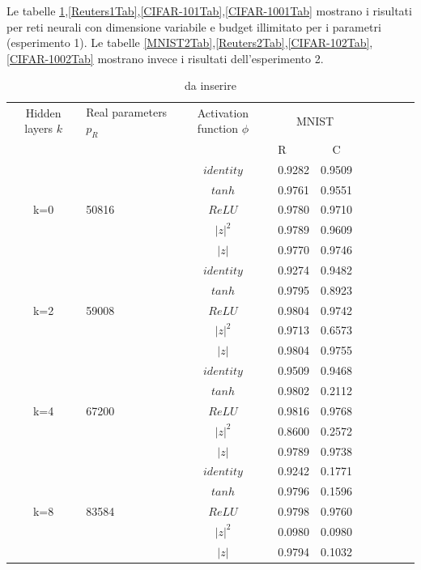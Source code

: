 \documentclass[a4paper,10pt]{article}
\begin{document}
 Le tabelle \ref{MNIST1Tab},\ref{Reuters1Tab},\ref{CIFAR-101Tab},\ref{CIFAR-1001Tab} mostrano i risultati per reti neurali con dimensione variabile e budget illimitato per i parametri (esperimento 1). Le tabelle \ref{MNIST2Tab},\ref{Reuters2Tab},\ref{CIFAR-102Tab},\ref{CIFAR-1002Tab} mostrano invece i risultati dell'esperimento 2.
 
 \begin{table}
  \centering
  \begin{tabular}{cp{} cp{}   cp{} cp{} cp{}}
   \cline{1-5}
   Hidden layers $k$ & Real parameters $p_R$ & Activation function $\phi$ & \multicolumn{2}{c}{MNIST}\\
   \cline{4-5}
   & & & R & C \\
   \cline{1-5}
   & & $identity$ & 0.9282 & 0.9509 \\
   \cline{3-5}
   & & $tanh$ & 0.9761 & 0.9551 \\
   \cline{3-5}
   k=0 & 50816 & $ReLU$ & 0.9780 & 0.9710 \\
   \cline{3-5}
   & & $|z|^2$ & 0.9789 & 0.9609 \\
   \cline{3-5}
   & & $|z|$ & 0.9770 & 0.9746 \\
   \cline{1-5}
  
   & & $identity$ & 0.9274 & 0.9482 \\
   \cline{3-5}
   & & $tanh$ & 0.9795 & 0.8923 \\
   \cline{3-5}
   k=2 & 59008 & $ReLU$ & 0.9804 & 0.9742 \\
   \cline{3-5}
   & & $|z|^2$ & 0.9713 & 0.6573 \\
   \cline{3-5}
   & & $|z|$ & 0.9804 & 0.9755 \\
   \cline{1-5}
  
   & & $identity$ & 0.9509 & 0.9468 \\
   \cline{3-5}
   & & $tanh$ & 0.9802 & 0.2112 \\
   \cline{3-5}
   k=4 & 67200 & $ReLU$ & 0.9816 & 0.9768 \\
   \cline{3-5}
   & & $|z|^2$ & 0.8600 & 0.2572 \\
   \cline{3-5}
   & & $|z|$ & 0.9789 & 0.9738 \\
   \cline{1-5}
   
   & & $identity$ & 0.9242 & 0.1771 \\
   \cline{3-5}
   & & $tanh$ & 0.9796 & 0.1596 \\
   \cline{3-5}
   k=8 & 83584 & $ReLU$ & 0.9798 & 0.9760 \\
   \cline{3-5}
   & & $|z|^2$ & 0.0980 & 0.0980 \\
   \cline{3-5}
   & & $|z|$ & 0.9794 & 0.1032 \\
   \cline{1-5}
  \end{tabular}
  \caption{da inserire}
  \label{MNIST1Tab}
 \end{table}
 
\end{document}
